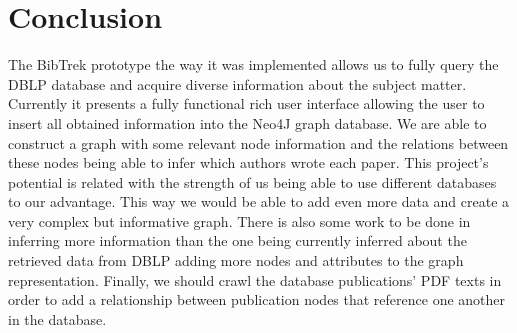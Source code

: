 \documentclass[twocolumn]{article}
\begin{document}
\section{Conclusion}
The BibTrek prototype the way it was implemented allows us to fully query the DBLP database and acquire diverse information about the subject matter. Currently it presents a fully functional rich user interface allowing the user to insert all obtained information into the Neo4J graph database. We are able to construct a graph with some relevant node information and the relations between these nodes being able to infer which authors wrote each paper. This project's potential is related with the strength of us being able to use different databases to our advantage. This way we would be able to add even more data and create a very complex but informative graph. There is also some work to be done in inferring more information than the one being currently inferred about the retrieved data from DBLP adding more nodes and attributes to the graph representation. Finally, we should crawl the database publications' PDF texts in order to add a relationship between publication nodes that reference one another in the database.
\end{document}
